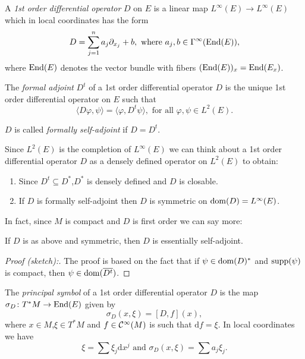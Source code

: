 \begin{definition}
 A \emph{1st order differential operator} $D$ on $E$ is a linear map $L^\infty(E)\to L^\infty(E)$ which in local coordinates has the form $$D=\sum_{j=1}^na_j\partial_{x_j}+b,\text{ where }a_j,b\in\Gamma^\infty(\mathrm{End}(E)),$$
 where $\mathrm{End}(E)$ denotes the vector bundle with fibers $(\mathrm{End}(E))_x=\mathrm{End} (E_x)$.
\end{definition}

\begin{definition}
 The \emph{formal adjoint} $D^t$ of a 1st order differential operator $D$ is the unique 1st order differential operator on $E$ such that $$\langle D\varphi,\psi\rangle=\langle\varphi,D^t\psi\rangle, \text{ for all }\varphi,\psi\in L^2(E).$$
 
 \noindent $D$ is called \emph{formally self-adjoint} if $D=D^t$.
\end{definition}

\begin{remark}
 Since $L^2(E)$ is the completion of $L^\infty(E)$ we can think about a 1st order differential operator $D$ as a densely defined operator on $L^2(E)$ to obtain:
 \begin{enumerate}
  \item Since $D^t\subseteq D^\ast$,$D^\ast$ is densely defined and $D$ is closable.
  \item If $D$ is formally self-adjoint then $D$ is symmetric on $\mathrm{dom} (D)=L^\infty(E)$.
 \end{enumerate}
\end{remark}
In fact, since $M$ is compact and $D$ is first order we can say more:
\begin{proposition}
 If $D$ is as above and symmetric, then $D$ is essentially self-adjoint.
\end{proposition}
\begin{proof}[Proof (sketch):] The proof is based on the fact that if $\psi\in\mathrm{dom} (D)^\ast$ and $\mathrm{supp}(\psi)$ is compact, then $\psi\in\mathrm{dom}(\overline{D^t})$.
\end{proof}

\begin{definition}
 The \emph{principal symbol} of a 1st order differential operator $D$ is the map $\sigma_D\colon T^\ast M\to\mathrm{End}(E)$ given by $$\sigma_D(x,\xi)=[D,f](x),$$ where $x\in M$,$\xi\in T^\ast M$ and $f\in\mathcal{C}^\infty(M)$ is such that $\mathrm{d}f=\xi$.  In local coordinates we have $$\xi=\sum\xi_j\mathrm{d}x^j\text{ and }\sigma_D(x,\xi)=\sum a_j\xi_j.$$ 
\end{definition}

